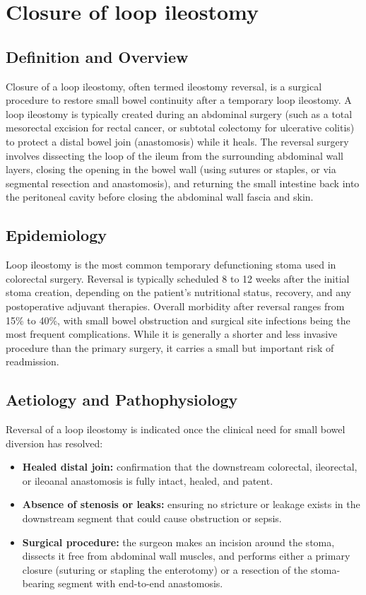 \chapter{Closure of loop ileostomy}

\section*{Definition and Overview}
Closure of a loop ileostomy, often termed ileostomy reversal, is a surgical procedure to restore small bowel continuity after a temporary loop ileostomy. A loop ileostomy is typically created during an abdominal surgery (such as a total mesorectal excision for rectal cancer, or subtotal colectomy for ulcerative colitis) to protect a distal bowel join (anastomosis) while it heals. The reversal surgery involves dissecting the loop of the ileum from the surrounding abdominal wall layers, closing the opening in the bowel wall (using sutures or staples, or via segmental resection and anastomosis), and returning the small intestine back into the peritoneal cavity before closing the abdominal wall fascia and skin.

\section*{Epidemiology}
Loop ileostomy is the most common temporary defunctioning stoma used in colorectal surgery. Reversal is typically scheduled 8 to 12 weeks after the initial stoma creation, depending on the patient's nutritional status, recovery, and any postoperative adjuvant therapies. Overall morbidity after reversal ranges from 15\% to 40\%, with small bowel obstruction and surgical site infections being the most frequent complications. While it is generally a shorter and less invasive procedure than the primary surgery, it carries a small but important risk of readmission.

\section*{Aetiology and Pathophysiology}
Reversal of a loop ileostomy is indicated once the clinical need for small bowel diversion has resolved:

\begin{itemize}
    \item \textbf{Healed distal join:} confirmation that the downstream colorectal, ileorectal, or ileoanal anastomosis is fully intact, healed, and patent.
    \item \textbf{Absence of stenosis or leaks:} ensuring no stricture or leakage exists in the downstream segment that could cause obstruction or sepsis.
    \item \textbf{Surgical procedure:} the surgeon makes an incision around the stoma, dissects it free from abdominal wall muscles, and performs either a primary closure (suturing or stapling the enterotomy) or a resection of the stoma-bearing segment with end-to-end anastomosis.
\end{itemize}

